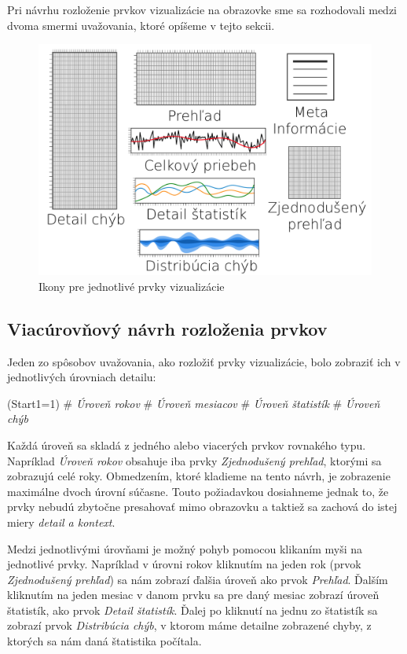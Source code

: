 Pri návrhu rozloženie prvkov vizualizácie na obrazovke sme sa rozhodovali medzi dvoma smermi uvažovania, ktoré opíšeme v tejto sekcii. 

\begin{figure}
	\centering
	\includegraphics[width = 4.5in]{designicons}
	\caption{Ikony pre jednotlivé prvky vizualizácie}
	\label{fig:designicons}
\end{figure}


\subsection{Viacúrovňový návrh rozloženia prvkov}
Jeden zo spôsobov uvažovania, ako rozložiť prvky vizualizácie, bolo zobraziť ich v jednotlivých úrovniach detailu: 
\begin{easylist}
	\ListProperties(Start1=1)
	# \textit{Úroveň rokov}
	# \textit{Úroveň mesiacov}
	# \textit{Úroveň štatistík}
	# \textit{Úroveň chýb} 
\end{easylist}

\noindent Každá úroveň sa skladá z jedného alebo viacerých prvkov rovnakého typu. Napríklad \textit{Úroveň rokov} obsahuje iba prvky \textit{Zjednodušený prehľad}, ktorými sa zobrazujú celé roky. Obmedzením, ktoré kladieme na tento návrh, je zobrazenie maximálne dvoch úrovní súčasne. Touto požiadavkou dosiahneme jednak to, že prvky nebudú zbytočne presahovať mimo obrazovku a taktiež sa zachová do istej miery \textit{detail a kontext}. 

Medzi jednotlivými úrovňami je možný pohyb pomocou klikaním myši na jednotlivé prvky. Napríklad v úrovni rokov kliknutím na jeden rok (prvok \textit{Zjednodušený prehľad}) sa nám zobrazí ďalšia úroveň ako prvok \textit{Prehľad}. Ďalším kliknutím na jeden mesiac v danom prvku sa pre daný mesiac zobrazí úroveň štatistík, ako prvok \textit{Detail štatistík}. Ďalej po kliknutí na jednu zo štatistík sa zobrazí prvok \textit{Distribúcia chýb}, v ktorom máme detailne zobrazené chyby, z ktorých sa nám daná štatistika počítala.

